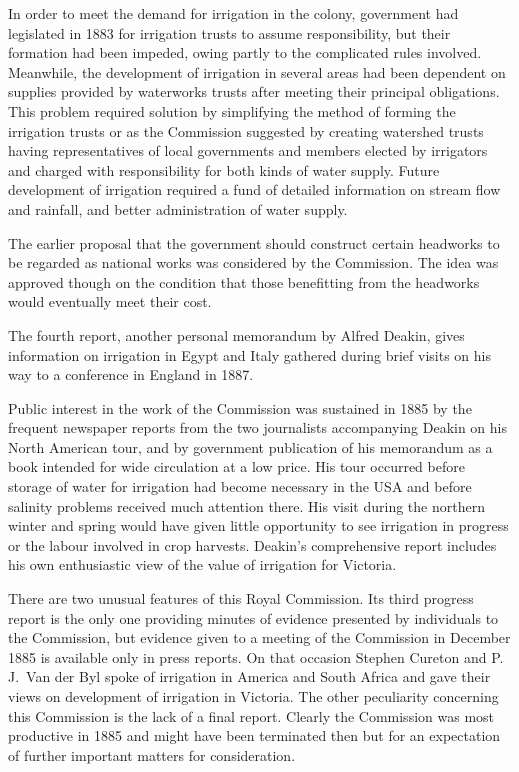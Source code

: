 In order to meet the demand for irrigation in the colony, government
had legislated in 1883 for irrigation trusts to assume responsibility,
but their formation had been impeded, owing partly to the complicated
rules involved.  Meanwhile, the development of irrigation in several
areas had been dependent on supplies provided by waterworks trusts
after meeting their principal obligations.  This problem required
solution by simplifying the method of forming the irrigation trusts
 or as the
Commission suggested by creating watershed trusts
 having
representatives of local governments and members elected by irrigators
and charged with responsibility for both kinds of water supply.
Future development of irrigation required a fund of detailed
information on stream flow and rainfall, and better administration of
water supply.

The earlier proposal that the government should construct certain
headworks to be regarded as national works was considered by the
Commission.  The idea was approved though on the condition that those
benefitting from the headworks would eventually meet their cost.

The fourth report, another personal memorandum by Alfred Deakin,
 gives
information on irrigation in Egypt  and Italy
 gathered
during brief visits on his way to a conference in England in
1887.

Public interest in the work of the Commission was sustained in 1885 by
the frequent newspaper reports from the two journalists accompanying
Deakin on his North American tour, and by government publication of
his memorandum as a book intended for wide circulation at a low price.
His tour occurred before storage of water for irrigation had become
necessary in the USA and before salinity \index{salinity} problems
received much attention there.  His visit during the northern winter
and spring would have given little opportunity to see irrigation in
progress or the labour involved in crop harvests.  Deakin's
comprehensive report includes his own enthusiastic view of the value
of irrigation for Victoria.

There are two unusual features of this Royal Commission.  Its third
progress report is the only one providing minutes of evidence
presented by individuals to the Commission, but evidence given to a
meeting of the Commission in December 1885 is available only in press
reports.  On that occasion Stephen Cureton and P.\,J.~Van der Byl
spoke of irrigation in America \index{USA} and South Africa
 and gave their views on development of irrigation
in Victoria.  The other peculiarity concerning this Commission is the
lack of a final report.  Clearly the Commission was most productive in
1885 and might have been terminated then but for an expectation of
further important matters for consideration.

